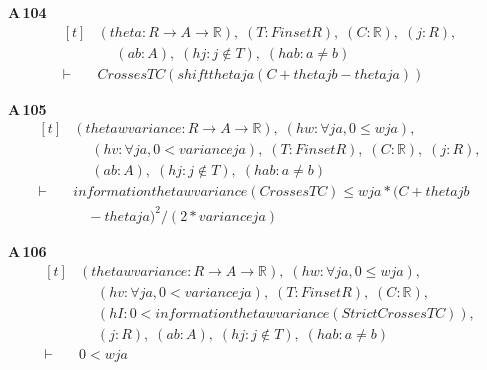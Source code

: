 \noindent\textbf{A\,104}\quad{}
{\footnotesize\[ \begin{aligned}[t]
&(\mathit{theta} : \mathit{R} \to \mathit{A} \to \mathbb{R} ),\; (\mathit{T} : \mathit{Finset} \mathit{R}),\; (\mathit{C} : \mathbb{R} ),\; (\mathit{j} : \mathit{R}),\\
&\quad \; (\mathit{a} \mathit{b} : \mathit{A}),\; (\mathit{hj} : \mathit{j} \notin \mathit{T}),\; (\mathit{hab} : \mathit{a} \neq \mathit{b})\\
\vdash\;&\mathit{Crosses} \mathit{T} \mathit{C} (\mathit{shift} \mathit{theta} \mathit{j} \mathit{a} (\mathit{C}+\mathit{theta} \mathit{j} \mathit{b}-\mathit{theta} \mathit{j} \mathit{a}))
\end{aligned} \]}

\noindent\textbf{A\,105}\quad{}
{\footnotesize\[ \begin{aligned}[t]
&(\mathit{theta} \mathit{w} \mathit{variance} : \mathit{R} \to \mathit{A} \to \mathbb{R} ),\; (\mathit{hw} : \forall \mathit{j} \mathit{a},0 \leq \mathit{w} \mathit{j} \mathit{a}),\\
&\quad \; (\mathit{hv} : \forall \mathit{j} \mathit{a},0 < \mathit{variance} \mathit{j} \mathit{a}),\; (\mathit{T} : \mathit{Finset} \mathit{R}),\; (\mathit{C} : \mathbb{R} ),\; (\mathit{j} : \mathit{R}),\\
&\quad \; (\mathit{a} \mathit{b} : \mathit{A}),\; (\mathit{hj} : \mathit{j} \notin \mathit{T}),\; (\mathit{hab} : \mathit{a} \neq \mathit{b})\\
\vdash\;&\mathit{information} \mathit{theta} \mathit{w} \mathit{variance} (\mathit{Crosses} \mathit{T} \mathit{C}) \leq \mathit{w} \mathit{j} \mathit{a}*(\mathit{C}+\mathit{theta} \mathit{j} \mathit{b}\\
&\quad -\mathit{theta} \mathit{j} \mathit{a})^{2}/(2*\mathit{variance} \mathit{j} \mathit{a})
\end{aligned} \]}

\noindent\textbf{A\,106}\quad{}
{\footnotesize\[ \begin{aligned}[t]
&(\mathit{theta} \mathit{w} \mathit{variance} : \mathit{R} \to \mathit{A} \to \mathbb{R} ),\; (\mathit{hw} : \forall \mathit{j} \mathit{a},0 \leq \mathit{w} \mathit{j} \mathit{a}),\\
&\quad \; (\mathit{hv} : \forall \mathit{j} \mathit{a},0 < \mathit{variance} \mathit{j} \mathit{a}),\; (\mathit{T} : \mathit{Finset} \mathit{R}),\; (\mathit{C} : \mathbb{R} ),\\
&\quad \; (\mathit{hI} : 0 < \mathit{information} \mathit{theta} \mathit{w} \mathit{variance} (\mathit{StrictCrosses} \mathit{T} \mathit{C})),\\
&\quad \; (\mathit{j} : \mathit{R}),\; (\mathit{a} \mathit{b} : \mathit{A}),\; (\mathit{hj} : \mathit{j} \notin \mathit{T}),\; (\mathit{hab} : \mathit{a} \neq \mathit{b})\\
\vdash\;&0 < \mathit{w} \mathit{j} \mathit{a}
\end{aligned} \]}

